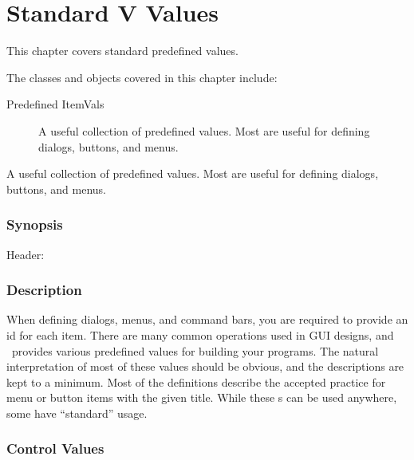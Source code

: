 

\chapter {Standard V Values}

This chapter covers standard predefined values.

The classes and objects covered in this chapter include:

\begin{description}
	\item[Predefined ItemVals] A useful collection of predefined values.
Most are useful for defining dialogs, buttons, and menus.
\end{description}


A useful collection of predefined values. Most are useful for defining
dialogs, buttons, and menus.

\subsection* {Synopsis}

\begin{description}
	\item [Header:] 
\end{description}

\subsection* {Description}

When defining dialogs, menus, and command bars, you are required
to provide an id for each item.  There are many common operations
used in GUI designs, and \V\ provides various predefined values
for building your programs. The natural interpretation of most
of these values should be obvious, and the descriptions are kept
to a minimum. Most of the definitions describe the accepted practice
for menu or button items with the given title. While these s
can be used anywhere, some have ``standard'' usage.

\subsection* {Control Values}

